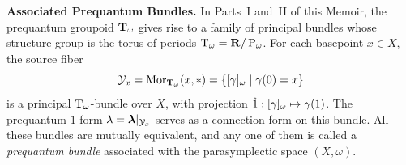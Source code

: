 \documentclass[10pt,reqno,letterpaper,twoside]{amsbook}
\begin{document}
\begin{article}
    \medskip
    \noindent
    \textbf{Associated Prequantum Bundles.}
    In Parts~I and~II of this Memoir,
    the prequantum groupoid $\mathbf{T}_\omega$ gives rise to a family of principal bundles
    whose structure group is the torus of periods $\mathrm{T}_\omega = {\mathbf{R}}/\operatorname{P}_\omega$.
    For each basepoint $x \in X$,
    the source fiber
    \[
      \mathcal{Y}_x = {\operatorname{Mor}}_{\mathbf{T}_\omega}(x,\ast) = \{ [\gamma]_\omega \mid \gamma(0) = x \}
      \]
    is a principal $\mathrm{T}_\omega$-bundle over $X$,
    with projection $\hat 1: [\gamma]_\omega \mapsto \gamma(1)$.
    The prequantum $1$-form $\lambda = \boldsymbol \lambda|_{\mathcal{Y}_x}$ serves as a connection form
    on this bundle.
    All these bundles are mutually equivalent,
    and any one of them is called a \emph{prequantum bundle}
    associated with the parasymplectic space $(X,\omega)$.
  \end{article}
  
\end{document}
